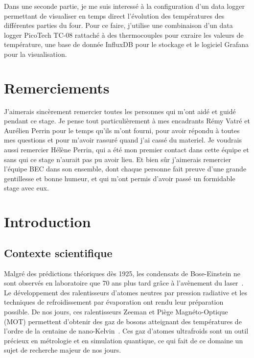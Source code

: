 \documentclass[12pt, a4paper]{article}
\begin{document}
\begin{titlepage}
  Dans une seconde partie, je me suis interessé à la configuration d'un data logger permettant de visualiser en temps direct l'évolution des températures des différentes parties du four. Pour ce faire, j'utilise une combinaison d'un data logger PicoTech TC-08 rattaché à des thermocouples pour exraire les valeurs de température, une base de donnée InfluxDB pour le stockage et le logiciel Grafana pour la visualisation. 
\end{titlepage}
\clearpage
{}

\tableofcontents

\newpage

\pagestyle{rapport}

\section*{Remerciements}

J'aimerais sincèrement remercier toutes les personnes qui m'ont aidé et guidé pendant ce stage. Je pense tout particulièrement à mes encadrants Rémy Vatré et Aurélien Perrin pour le temps qu'ils m'ont fourni, pour avoir répondu à toutes mes questions et pour m'avoir rassuré quand j'ai cassé du materiel. Je voudrais aussi remercier Hélène Perrin, qui a été mon premier contact dans cette équipe et sans qui ce stage n'aurait pas pu avoir lieu. Et bien sûr j'aimerais remercier l'équipe BEC dans son ensemble, dont chaque personne fait preuve d'une grande gentillesse et bonne humeur, et qui m'ont permis d'avoir passé un formidable stage avec eux.

\section{Introduction}

\subsection{Contexte scientifique}

Malgré des prédictions théoriques dès 1925, les condensats de Bose-Einstein ne sont observés en laboratoire que 70 ans plus tard grâce à l'avènement du laser~\cite{BEC}. Le développement des ralentisseurs d'atomes neutres par pression radiative et les techniques de refroidissement par évaporation ont rendu leur préparation possible. De nos jours, ces ralentisseurs Zeeman et Piège Magnéto-Optique (MOT) permettent d'obtenir des gaz de bosons atteignant des températures de l'ordre de la centaine de nano-Kelvin~\cite{BEC}. Ces gaz d'atomes ultrafroids sont un outil précieux en métrologie et en simulation quantique, ce qui fait de ce domaine un sujet de recherche majeur de nos jours\cite{ballu_production_2024}. 
\end{document}
